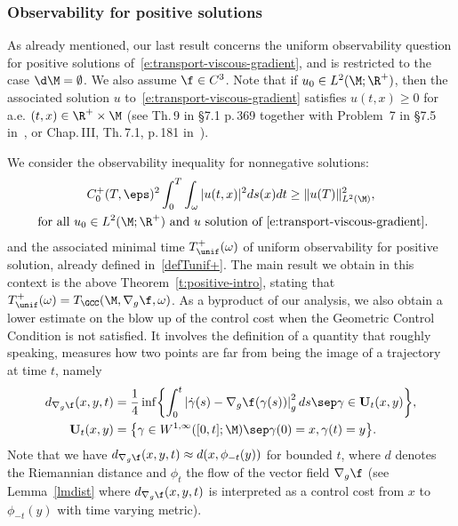 \subsubsection{Observability for positive solutions}
As already mentioned, our last result concerns the uniform observability question for positive solutions of~\eqref{e:transport-viscous-gradient}, and is restricted to the case $\d\M=\emptyset$. We also assume $\f\in C^3$.
Note that if $u_0 \in L^2(\M; \R^+)$, then the associated solution $u$ to~\eqref{e:transport-viscous-gradient} satisfies $u(t,x) \geq 0$ for a.e. $(t,x) \in \R^+\times\M$ (see \eg Th.\,9 in \S7.1 p.\,369 together with Problem~7 in \S 7.5 in~\cite{Evans:98}, or Chap.\,III, Th.\,7.1, p.\,181 in~\cite{LSU:68}).

We consider the observability inequality for nonnegative solutions:
\begin{multline}
\label{e:transport-viscous-obsplus}
C_0^+(T,\eps)^2 \int_0^T\int_\omega |u(t,x)|^2 ds(x)dt \geq \|u (T)\|_{L^2(\M)}^2, \\
\text{ for all } u_0 \in L^2(\M; \R^+)\text{ and } u \text{ solution of~\eqref{e:transport-viscous-gradient}}.
\end{multline}
and the associated minimal time $T_{\unif}^+(\omega)$ of uniform observability for positive solution, already defined in~\eqref{defTunif+}. The main result we obtain in this context is the above Theorem~\ref{t:positive-intro}, stating that $T_{\unif}^+(\omega)=T_{\GCC}(\M, \nabla_g\f,\omega)$.
As a byproduct of our analysis, we also obtain a lower estimate on the blow up of the control cost when the Geometric Control Condition is not satisfied. It involves the definition of a quantity that roughly speaking, measures how two points are far from being the image of a trajectory at time $t$, namely
\begin{align}
\label{defdXintro} d_{\nabla_g\f}(x,y,t)&=\frac{1}{4} \inf \biggl\{ \int_0^t \left|\dot{\gamma}(s)-\nabla_g \f(\gamma(s))\right|_g^{2} ds\sep \gamma \in \mathbf{U}_t(x,y)
\biggr\}, \\
\mathbf{U}_t(x,y) & = \bigl\{\gamma \in W^{1,\infty} ([0,t] ; \M )\sep\gamma(0)=x, \gamma(t)= y \bigr\}. \notag
\end{align}
Note that we have $ d_{\nabla_g\f}(x,y,t)\approx d(x,\phi_{-t}(y))$ for bounded $t$, where $d$ denotes the Riemannian distance and $\phi_t$ the flow of the vector field $\nabla_g \f$ (see Lemma~\ref{lmdist} where $d_{\nabla_g\f}(x,y,t)$ is interpreted as a control cost from $x$ to $\phi_{-t}(y)$ with time varying metric).
